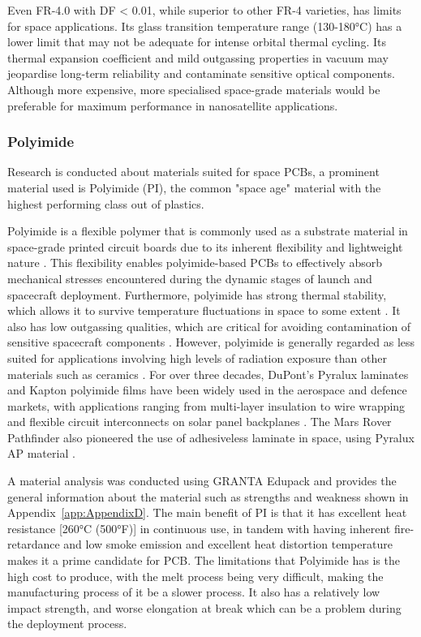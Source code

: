 Even FR-4.0 with DF < 0.01, while superior to other FR-4 varieties, has limits for space applications.
Its glass transition temperature range (130-180°C) has a lower limit that may not be adequate for intense orbital thermal cycling.
Its thermal expansion coefficient and mild outgassing properties in vacuum may jeopardise long-term reliability and contaminate sensitive optical components.
Although more expensive, more specialised space-grade materials would be preferable for maximum performance in nanosatellite applications.

\subsubsection{Polyimide}
Research is conducted about materials suited for space PCBs, a prominent material used is Polyimide (PI), the common "space age" material with the highest performing class out of plastics.

Polyimide is a flexible polymer that is commonly used as a substrate material in space-grade printed circuit boards due to its inherent flexibility and lightweight nature \cite{RefWorks:2025applying}. 
This flexibility enables polyimide-based PCBs to effectively absorb mechanical stresses encountered during the dynamic stages of launch and spacecraft deployment.
Furthermore, polyimide has strong thermal stability, which allows it to survive temperature fluctuations in space to some extent \cite{RefWorks:2025applying}.
It also has low outgassing qualities, which are critical for avoiding contamination of sensitive spacecraft components \cite{RefWorks:proto-electronics2024space-grade}.
However, polyimide is generally regarded as less suited for applications involving high levels of radiation exposure than other materials such as ceramics \cite{RefWorks:2025applying}. 
For over three decades, DuPont's Pyralux laminates and Kapton polyimide films have been widely used in the aerospace and defence markets, with applications ranging from multi-layer insulation to wire wrapping and flexible circuit interconnects on solar panel backplanes \cite{RefWorks:2024making}. 
The Mars Rover Pathfinder also pioneered the use of adhesiveless laminate in space, using Pyralux AP material \cite{RefWorks:2024making}.

A material analysis was conducted using GRANTA Edupack and provides the general information about the material such as strengths and weakness shown in Appendix~\ref{app:AppendixD}. 
The main benefit of PI is that it has excellent heat resistance [260°C (500°F)] in continuous use, in tandem with having inherent fire-retardance and low smoke emission and excellent heat distortion temperature makes it a prime candidate for PCB. 
The limitations that Polyimide has is the high cost to produce, with the melt process being very difficult, making the manufacturing process of it be a slower process. 
It also has a relatively low impact strength, and worse elongation at break which can be a problem during the deployment process.

